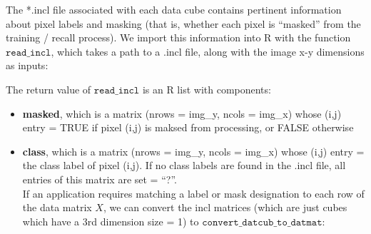 \documentclass[]{article}
\newenvironment{Shaded}{\begin{snugshade}}{\end{snugshade}}
\newcommand{\CommentTok}[1]{\textcolor[rgb]{0.56,0.35,0.01}{\textit{#1}}}
\newcommand{\DataTypeTok}[1]{\textcolor[rgb]{0.13,0.29,0.53}{#1}}
\newcommand{\KeywordTok}[1]{\textcolor[rgb]{0.13,0.29,0.53}{\textbf{#1}}}
\newcommand{\NormalTok}[1]{#1}
\newcommand{\OperatorTok}[1]{\textcolor[rgb]{0.81,0.36,0.00}{\textbf{#1}}}
\newcommand{\StringTok}[1]{\textcolor[rgb]{0.31,0.60,0.02}{#1}}
\providecommand{\tightlist}{%
  \setlength{\itemsep}{0pt}\setlength{\parskip}{0pt}}
\begin{document}
The *.incl file associated with each data cube contains pertinent information about pixel labels and masking (that is, whether each pixel is ``masked'' from the training / recall process). We import this information into R with the function \(\texttt{read\_incl}\), which takes a path to a .incl file, along with the image x-y dimensions as inputs:

\begin{Shaded}
\end{Shaded}

The return value of \(\texttt{read\_incl}\) is an R list with components:

\begin{itemize}
\tightlist
\item
  \textbf{masked}, which is a matrix (nrows = img\_y, ncols = img\_x) whose (i,j) entry = TRUE if pixel (i,j) is maksed from processing, or FALSE otherwise
\item
  \textbf{class}, which is a matrix (nrows = img\_y, ncols = img\_x) whose (i,j) entry = the class label of pixel (i,j). If no class labels are found in the .incl file, all entries of this matrix are set = ``?''.\\
  If an application requires matching a label or mask designation to each row of the data matrix \(X\), we can convert the incl matrices (which are just cubes which have a 3rd dimension size = 1) to \(\texttt{convert\_datcub\_to\_datmat}\):
\end{itemize}

\begin{Shaded}
\end{Shaded}
\end{document}
